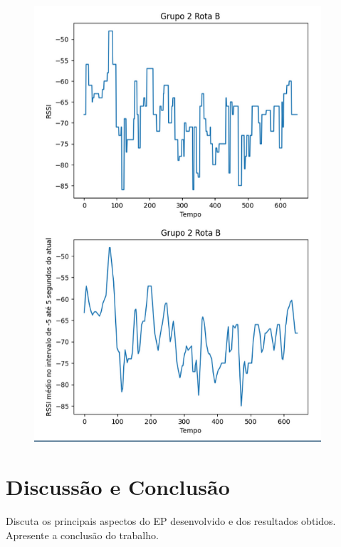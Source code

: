 \documentclass{article}
\begin{document}
\begin{figure}
  \begin{center}
    \includegraphics[width=0.95\textwidth]{figures/grupo_2-rota_b}
  \end{center}
  \caption{}\label{fig:}
\end{figure}


\section{Discussão e Conclusão}

Discuta os principais aspectos do EP desenvolvido e dos resultados obtidos. Apresente a conclusão do trabalho.
\end{document}
